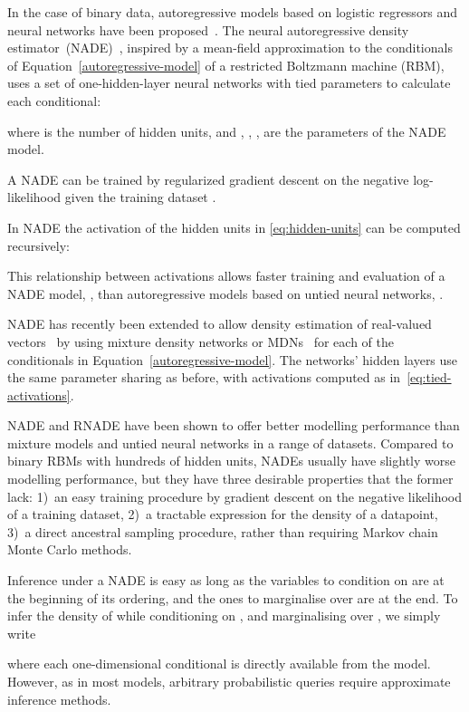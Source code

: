 \documentclass{article}
\begin{document}
In the case of binary data, autoregressive models based on logistic regressors
and neural networks have been proposed~\cite{Frey98,bengio:2000:nips}. The neural autoregressive density
estimator~(NADE)~\cite{Larochelle+Murray-2011}, inspired by a mean-field approximation to the
conditionals of Equation~\eqref{autoregressive-model} of a restricted Boltzmann machine
(RBM), uses a set of one-hidden-layer neural networks with tied parameters to
calculate each conditional:

where  is the number of hidden units, and , , ,
 are the parameters of the NADE model.

A NADE can be trained by regularized gradient descent on the negative
log-likelihood given the training dataset .

In NADE the activation of the hidden units in \eqref{eq:hidden-units} can be
computed recursively:

This relationship between activations allows faster training and evaluation of a
NADE model, , than autoregressive models based on untied neural networks,
.

NADE has recently been extended to allow density estimation of real-valued
vectors~\cite{UriaB2013} by using mixture density networks or MDNs~\cite{BishopC1994} for each of the
conditionals in Equation~\eqref{autoregressive-model}. The networks' hidden
layers use the same parameter sharing as before, with activations computed as
in~\eqref{eq:tied-activations}.

NADE and RNADE have been shown to offer better modelling performance than
mixture models and untied neural networks  in a range of datasets.
Compared to binary RBMs with hundreds of hidden units, NADEs usually have
slightly worse modelling performance, but they have three desirable
properties that the former lack: 1)~an easy training procedure by gradient
descent on the negative likelihood of a training dataset, 2)~a tractable
expression for the density of a datapoint, 3)~a direct ancestral sampling
procedure, rather than requiring Markov chain Monte Carlo methods.

Inference under a NADE is easy as long as the variables to condition on are at
the beginning of its ordering, and the ones to marginalise over are at the end.
To infer the density of  while
conditioning on , and marginalising over
, we simply write

where each one-dimensional conditional is directly available from the model.
However, as in most models, arbitrary probabilistic queries require approximate
inference methods.
\end{document}
